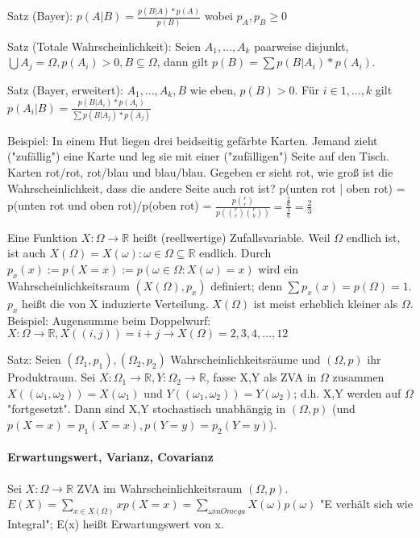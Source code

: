 \documentclass[a4paper]{article}
\begin{document}
\begin{multicols}{3}
    Satz (Bayer): $p(A|B)=\frac{p(B|A)*p(A)}{p(B)}$ wobei $p_A, p_B \geq 0$
    
    Satz (Totale Wahrscheinlichkeit): Seien $A_1, ...,A_k$ paarweise disjunkt, $\bigcup A_j=\Omega, p(A_i)>0, B\subseteq \Omega$, dann gilt $p(B)=\sum p(B|A_i)*p(A_i)$.
    
    Satz (Bayer, erweitert): $A_1,...,A_k,B$ wie eben, $p(B)>0$. Für $i\in {1,...,k}$ gilt $p(A_i|B)=\frac{p(B|A_i)*p(A_i)}{\sum p(B|A_j)*p(A_j)}$
    
    Beispiel: In einem Hut liegen drei beidseitig gefärbte Karten. Jemand zieht ("zufällig") eine Karte und leg sie mit einer ("zufälligen") Seite auf den Tisch. Karten rot/rot, rot/blau und blau/blau. Gegeben er sieht rot, wie groß ist die Wahrscheinlichkeit, dass die andere Seite auch rot ist?
    p(unten rot | oben rot) = p(unten rot und oben rot)/p(oben rot) = $\frac{p\binom{r}{r}}{p(\binom{r}{r}\binom{r}{b})}=\frac{\frac{2}{6}}{\frac{3}{6}}=\frac{2}{3}$
    
    Eine Funktion $X:\Omega \rightarrow \mathbb{R}$ heißt (reellwertige) Zufallsvariable. Weil $\Omega$ endlich ist, ist auch $X(\Omega)={X(\omega): \omega \in \Omega}\subseteq \mathbb{R}$ endlich. Durch $p_x(x):=p(X=x):=p({\omega \in \Omega: X(\omega)=x})$ wird ein Wahrscheinlichkeitsraum $(X(\Omega),p_x)$ definiert; denn $\sum p_x(x)=p(\Omega)=1$. $p_x$ heißt die von X induzierte Verteilung. $X(\Omega)$ ist meist erheblich kleiner als $\Omega$.
    Beispiel: Augensumme beim Doppelwurf: $X:\Omega\rightarrow \mathbb{R}, X((i,j))=i+j \rightarrow X(\Omega)={2,3,4,...,12}$
    
    Satz: Seien $(\Omega_1, p_1),(\Omega_2, p_2)$ Wahrscheinlichkeitsräume und $(\Omega, p)$ ihr Produktraum. Sei $X:\Omega_1\rightarrow\mathbb{R},Y:\Omega_2\rightarrow \mathbb{R}$, fasse X,Y als ZVA in $\Omega$ zusammen $X((\omega_1,\omega_2))=X(\omega_1)$ und $Y((\omega_1,\omega_2))=Y(\omega_2)$; d.h. X,Y werden auf $\Omega$ "fortgesetzt". Dann sind X,Y stochastisch unabhängig in $(\Omega, p)$ (und $p(X=x)=p_1(X=x), p(Y=y)=p_2(Y=y)$).
    
    \paragraph{Erwartungswert, Varianz, Covarianz}
    Sei $X:\Omega\rightarrow \mathbb{R}$ ZVA im Wahrscheinlichkeitsraum $(\Omega, p)$. $E(X)=\sum_{x\in X(\Omega)}x p(X=x)=\sum_{\omega in Omega} X(\omega)p(\omega)$ "E verhält sich wie Integral"; E(x) heißt Erwartungswert von x.
    

\end{multicols}
\end{document}
